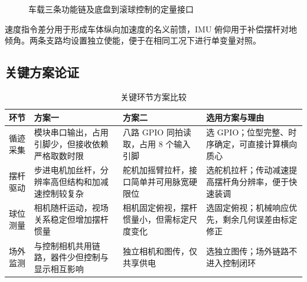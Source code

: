 \documentclass[12pt,a4paper]{ctexart}
\newcommand{\chartnote}[1]{}
\begin{document}
\begin{figure}[H]
{}
\caption{车载三条功能链及底盘到滚球控制的定量接口}
\label{fig:system}
\chartnote{绿色、蓝色和橙色分别表示底盘、滚球与监测功能归属；真正连接两个控制问题的是速度指令差分和 IMU 俯仰，监测图传始终在闭环之外。}
\end{figure}

速度指令差分用于形成车体纵向加速度的名义前馈，IMU 俯仰用于补偿摆杆对地倾角。两条支路均设置独立使能，便于在相同工况下进行单变量对照。

\subsection{关键方案论证}

\begin{table}[H]
\centering
\caption{关键环节方案比较}\label{tab:scheme}
\footnotesize
\setlength{\tabcolsep}{4pt}
\begin{tabular}{L{2.2cm}L{4.1cm}L{4.1cm}L{4.4cm}}
\toprule
环节 & 方案一 & 方案二 & 选用方案与理由 \\
\midrule
循迹采集 & 模块串口输出，占用引脚少，但接收依赖严格取数时限 & 八路 GPIO 同拍读取，占用 8 个输入引脚 & 选 GPIO；位型完整、时序确定，可直接计算横向质心 \\
摆杆驱动 & 步进电机加丝杆，分辨率高但结构和加减速控制较复杂 & 舵机加摇臂拉杆，接口简单并可用脉宽硬限位 & 选舵机拉杆；传动减速提高摆杆角分辨率，便于快速装调 \\
球位测量 & 相机随杆运动，视场关系稳定但增加摆杆惯量 & 相机固定俯视，摆杆惯量小，但需标定尺度变化 & 选固定俯视；机械响应优先，剩余几何误差由标定修正 \\
场外监测 & 与控制相机共用链路，器件少但控制与显示相互影响 & 独立相机和图传，仅共享供电 & 选独立图传；场外链路不进入控制闭环 \\
\bottomrule
\end{tabular}
\end{table}
\end{document}
